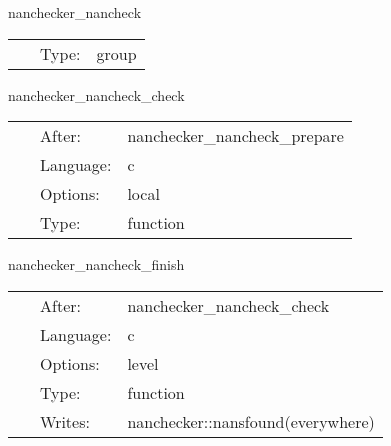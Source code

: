 \documentclass{article}
\begin{document}

\hspace{5mm} nanchecker\_nancheck 

\hspace{5mm}{\it check for nans and count them in nanchecker::nansfound } 


\hspace{5mm}

 \begin{tabular*}{160mm}{cll} 
~ & Type:  & group \\ 
\end{tabular*} 


\vspace{5mm}


\hspace{5mm} nanchecker\_nancheck\_check 

\hspace{5mm}{\it check for nans } 


\hspace{5mm}

 \begin{tabular*}{160mm}{cll} 
~ & After:  & nanchecker\_nancheck\_prepare \\ 
~ & Language:  & c \\ 
~ & Options:  & local \\ 
~ & Type:  & function \\ 
\end{tabular*} 


\vspace{5mm}


\hspace{5mm} nanchecker\_nancheck\_finish 

\hspace{5mm}{\it count nans in nanchecker::nansfound } 


\hspace{5mm}

 \begin{tabular*}{160mm}{cll} 
~ & After:  & nanchecker\_nancheck\_check \\ 
~ & Language:  & c \\ 
~ & Options:  & level \\ 
~ & Type:  & function \\ 
~ & Writes:  & nanchecker::nansfound(everywhere) \\ 
\end{tabular*} 
\end{document}
